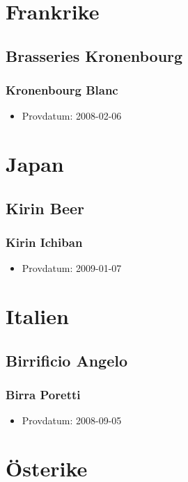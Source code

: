 \documentclass[11pt]{article}
\begin{document}
\section{Frankrike}
\label{sec:org60cf661}
\subsection{Brasseries Kronenbourg}
\label{sec:orgec380e4}
\subsubsection{Kronenbourg Blanc}
\label{sec:org4962763}
\begin{itemize}
\item Provdatum: 2008-02-06
\end{itemize}
\section{Japan}
\label{sec:org93a3ea7}
\subsection{Kirin Beer}
\label{sec:orgd564de9}
\subsubsection{Kirin Ichiban}
\label{sec:orgc53da0b}
\begin{itemize}
\item Provdatum: 2009-01-07
\end{itemize}
\section{Italien}
\label{sec:org1c9d545}
\subsection{Birrificio Angelo}
\label{sec:org308dba3}
\subsubsection{Birra Poretti}
\label{sec:org2ce95fe}
\begin{itemize}
\item Provdatum: 2008-09-05
\end{itemize}
\section{Österike}
\label{sec:org7e8d647}
\end{document}
